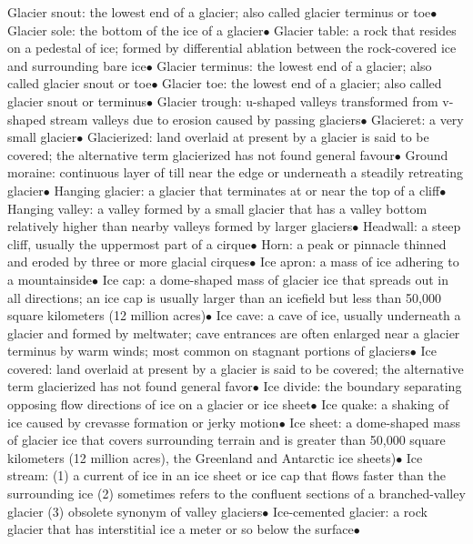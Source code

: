\documentclass{article}
\newcommand{\ddd}{$\bullet$}
\begin{document}
\begin{multicols*}{4}
        Glacier snout: the lowest end of a glacier; also called glacier terminus or toe\ddd
        Glacier sole: the bottom of the ice of a glacier\ddd
        Glacier table: a rock that resides on a pedestal of ice; formed by differential ablation between the rock-covered ice and surrounding bare ice\ddd
        Glacier terminus: the lowest end of a glacier; also called glacier snout or toe\ddd
        Glacier toe: the lowest end of a glacier; also called glacier snout or terminus\ddd
        Glacier trough: u-shaped valleys transformed from v-shaped stream valleys due to erosion caused by passing glaciers\ddd
        Glacieret: a very small glacier\ddd
        Glacierized: land overlaid at present by a glacier is said to be covered; the alternative term glacierized has not found general favour\ddd
        Ground moraine: continuous layer of till near the edge or underneath a steadily retreating glacier\ddd
        Hanging glacier: a glacier that terminates at or near the top of a cliff\ddd
        Hanging valley: a valley formed by a small glacier that has a valley bottom relatively higher than nearby valleys formed by larger glaciers\ddd
        Headwall: a steep cliff, usually the uppermost part of a cirque\ddd
        Horn: a peak or pinnacle thinned and eroded by three or more glacial cirques\ddd
        Ice apron: a mass of ice adhering to a mountainside\ddd
        Ice cap: a dome-shaped mass of glacier ice that spreads out in all directions; an ice cap is usually larger than an icefield but less than 50,000 square kilometers (12 million acres)\ddd
        Ice cave: a cave of ice, usually underneath a glacier and formed by meltwater; cave entrances are often enlarged near a glacier terminus by warm winds; most common on stagnant portions of glaciers\ddd
        Ice covered: land overlaid at present by a glacier is said to be covered; the alternative term glacierized has not found general favor\ddd
        Ice divide: the boundary separating opposing flow directions of ice on a glacier or ice sheet\ddd
        Ice quake: a shaking of ice caused by crevasse formation or jerky motion\ddd
        Ice sheet: a dome-shaped mass of glacier ice that covers surrounding terrain and is greater than 50,000 square kilometers (12 million acres), the Greenland and Antarctic ice sheets)\ddd
        Ice stream: (1) a current of ice in an ice sheet or ice cap that flows faster than the surrounding ice (2) sometimes refers to the confluent sections of a branched-valley glacier (3) obsolete synonym of valley glaciers\ddd
        Ice-cemented glacier: a rock glacier that has interstitial ice a meter or so below the surface\ddd

\end{multicols*}
\end{document}
